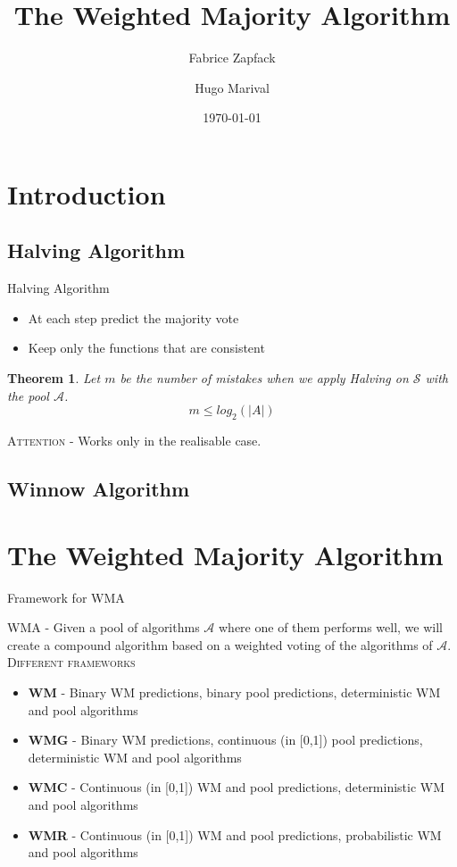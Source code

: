 \documentclass{beamer}
\title{The Weighted Majority Algorithm}
\author{Fabrice Zapfack 
\and Hugo Marival}
\date{\today}
\newtheorem{Th}{Theorem}
\begin{document}
	\begin{frame}[label=titre]
		\titlepage
	\end{frame}
	
	\section{Introduction}
		\subsection{Halving Algorithm}
			\begin{frame}{Halving Algorithm}

				  
				\begin{itemize}
				\item At each step predict the majority vote
				\item Keep only the functions that are consistent
				\end{itemize}
				\begin{Th}
					Let $m$ be the number of mistakes when we apply Halving on $\mathcal{S}$ with the pool $\mathcal{A}$.
					\[m \leq log_2(|A|)\]
				\end{Th}
				\textsc{Attention} - Works only in the realisable case. 
			\end{frame}

		\subsection*{Winnow Algorithm}

	\section{The Weighted Majority Algorithm}
	
\begin{frame}{Framework for WMA}

\textsc{WMA} - Given a pool of algorithms $\mathcal{A}$ where one of them performs well, we will create a compound algorithm based on a weighted voting of the algorithms of $\mathcal{A}$. \newline\newline
\textsc{Different frameworks}  
\begin{itemize}
\item \textbf{WM} - Binary WM predictions, binary pool predictions, deterministic WM and pool algorithms
\item \textbf{WMG} - Binary WM predictions, continuous (in [0,1]) pool predictions, deterministic WM and pool algorithms
\item \textbf{WMC} - Continuous (in [0,1]) WM and pool predictions, deterministic WM and pool algorithms
\item \textbf{WMR} - Continuous (in [0,1]) WM and pool predictions, probabilistic WM and pool algorithms
\end{itemize}

\end{frame}
\end{document}
